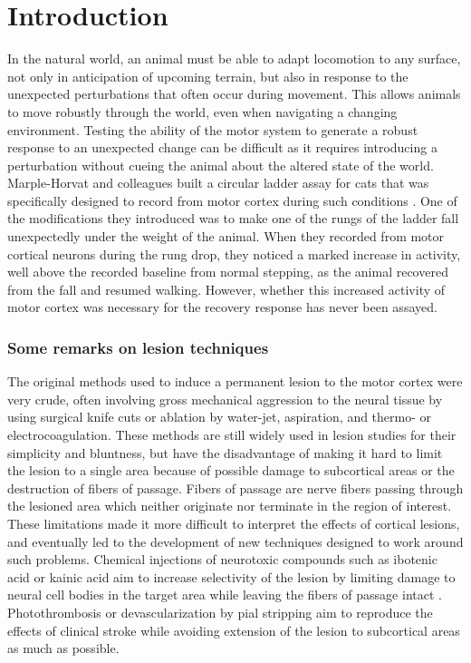 \section{Introduction}

In the natural world, an animal must be able to adapt locomotion to any surface, not only in anticipation of upcoming terrain, but also in response to the unexpected perturbations that often occur during movement. This allows animals to move robustly through the world, even when navigating a changing environment. Testing the ability of the motor system to generate a robust response to an unexpected change can be difficult as it requires introducing a perturbation without cueing the animal about the altered state of the world. Marple-Horvat and colleagues built a circular ladder assay for cats that was specifically designed to record from motor cortex during such conditions \cite{Marple-Horvat1993}. One of the modifications they introduced was to make one of the rungs of the ladder fall unexpectedly under the weight of the animal. When they recorded from motor cortical neurons during the rung drop, they noticed a marked increase in activity, well above the recorded baseline from normal stepping, as the animal recovered from the fall and resumed walking. However, whether this increased activity of motor cortex was necessary for the recovery response has never been assayed.

\subsubsection*{Some remarks on lesion techniques}

The original methods used to induce a permanent lesion to the motor cortex were very crude, often involving gross mechanical aggression to the neural tissue by using surgical knife cuts or ablation by water-jet, aspiration, and thermo- or electrocoagulation. These methods are still widely used in lesion studies for their simplicity and bluntness, but have the disadvantage of making it hard to limit the lesion to a single area because of possible damage to subcortical areas or the destruction of fibers of passage. Fibers of passage are nerve fibers passing through the lesioned area which neither originate nor terminate in the region of interest. These limitations made it more difficult to interpret the effects of cortical lesions, and eventually led to the development of new techniques designed to work around such problems. Chemical injections of neurotoxic compounds such as ibotenic acid or kainic acid aim to increase selectivity of the lesion by limiting damage to neural cell bodies in the target area while leaving the fibers of passage intact \cite{Schwarcz1979}. Photothrombosis \cite{Watson1985} or devascularization by pial stripping \cite{Meyer1971} aim to reproduce the effects of clinical stroke while avoiding extension of the lesion to subcortical areas as much as possible.


